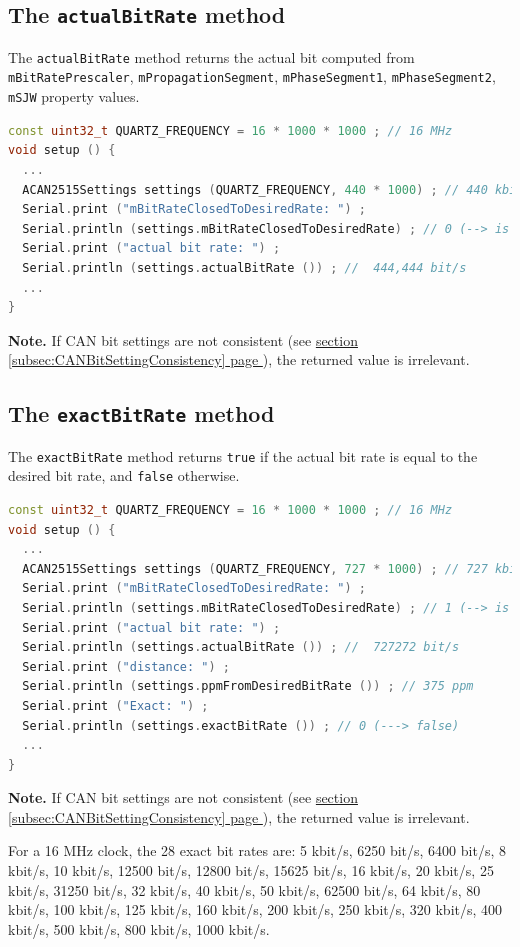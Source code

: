 \documentclass[10pt, a4paper, obeyspaces]{extarticle}
\newcommand \subsectionLabel[2]{\subsection{#1}\label{subsec:#2}}
\newcommand\refSubsectionPage[1]{\hyperref[subsec:#1]{section \ref*{subsec:#1} page \pageref{subsec:#1}}}
\begin{document}
\subsectionLabel{The \texttt{actualBitRate} method}{actualBitRate}


The \texttt{actualBitRate} method returns the actual bit computed from \texttt{mBitRatePrescaler}, \texttt{mPropagationSegment}, \texttt{mPhaseSegment1}, \texttt{mPhaseSegment2}, \texttt{mSJW} property values.

{ \small\begin{lstlisting}[language=c++]
const uint32_t QUARTZ_FREQUENCY = 16 * 1000 * 1000 ; // 16 MHz
void setup () {
  ...
  ACAN2515Settings settings (QUARTZ_FREQUENCY, 440 * 1000) ; // 440 kbit/s 
  Serial.print ("mBitRateClosedToDesiredRate: ") ;
  Serial.println (settings.mBitRateClosedToDesiredRate) ; // 0 (--> is false)
  Serial.print ("actual bit rate: ") ;
  Serial.println (settings.actualBitRate ()) ; //  444,444 bit/s
  ...
}
\end{lstlisting}}

{\bf Note. } If CAN bit settings are not consistent (see \refSubsectionPage{CANBitSettingConsistency}), the returned value is irrelevant.











\subsectionLabel{The \texttt{exactBitRate} method}{exactBitRate}


The \texttt{exactBitRate} method returns \texttt{true} if the actual bit rate is equal to the desired bit rate, and \texttt{false} otherwise.

{ \small\begin{lstlisting}[language=c++]
const uint32_t QUARTZ_FREQUENCY = 16 * 1000 * 1000 ; // 16 MHz
void setup () {
  ...
  ACAN2515Settings settings (QUARTZ_FREQUENCY, 727 * 1000) ; // 727 kbit/s
  Serial.print ("mBitRateClosedToDesiredRate: ") ;
  Serial.println (settings.mBitRateClosedToDesiredRate) ; // 1 (--> is true)
  Serial.print ("actual bit rate: ") ;
  Serial.println (settings.actualBitRate ()) ; //  727272 bit/s
  Serial.print ("distance: ") ;
  Serial.println (settings.ppmFromDesiredBitRate ()) ; // 375 ppm
  Serial.print ("Exact: ") ;
  Serial.println (settings.exactBitRate ()) ; // 0 (---> false)
  ...
}
\end{lstlisting}}

{\bf Note. } If CAN bit settings are not consistent (see \refSubsectionPage{CANBitSettingConsistency}), the returned value is irrelevant.

For a 16 MHz clock, the 28 exact bit rates are:  5 kbit/s, 6250 bit/s, 6400 bit/s, 8 kbit/s, 10 kbit/s, 12500 bit/s, 12800 bit/s, 15625 bit/s, 16 kbit/s, 20 kbit/s, 25 kbit/s, 31250 bit/s, 32 kbit/s, 40 kbit/s, 50 kbit/s, 62500 bit/s, 64 kbit/s, 80 kbit/s, 100 kbit/s, 125 kbit/s, 160 kbit/s, 200 kbit/s, 250 kbit/s, 320 kbit/s, 400 kbit/s, 500 kbit/s, 800 kbit/s, 1000 kbit/s.
\end{document}
